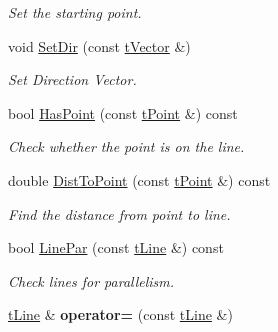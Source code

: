 \begin{DoxyCompactItemize}
\begin{DoxyCompactList}\small\item\em Set the starting point. \end{DoxyCompactList}\item 
\mbox{\label{classtLine_acff75aa6563c398c06c2ed5e4d118bb4}} 
void \hyperlink{classtLine_acff75aa6563c398c06c2ed5e4d118bb4}{Set\+Dir} (const \hyperlink{classtVector}{t\+Vector} \&)
\begin{DoxyCompactList}\small\item\em Set Direction Vector. \end{DoxyCompactList}\item 
\mbox{\label{classtLine_aeab725824ab76aa77c24c909086647f7}} 
bool \hyperlink{classtLine_aeab725824ab76aa77c24c909086647f7}{Has\+Point} (const \hyperlink{classtPoint}{t\+Point} \&) const
\begin{DoxyCompactList}\small\item\em Check whether the point is on the line. \end{DoxyCompactList}\item 
\mbox{\label{classtLine_a5b0fe2c1ec1e51fdd35021ab37532ea8}} 
double \hyperlink{classtLine_a5b0fe2c1ec1e51fdd35021ab37532ea8}{Dist\+To\+Point} (const \hyperlink{classtPoint}{t\+Point} \&) const
\begin{DoxyCompactList}\small\item\em Find the distance from point to line. \end{DoxyCompactList}\item 
\mbox{\label{classtLine_a1c3671f6868050035c0b2e5c90eaa143}} 
bool \hyperlink{classtLine_a1c3671f6868050035c0b2e5c90eaa143}{Line\+Par} (const \hyperlink{classtLine}{t\+Line} \&) const
\begin{DoxyCompactList}\small\item\em Check lines for parallelism. \end{DoxyCompactList}\item 
\mbox{\label{classtLine_aca3e282559b32039c0aae22eaff100f6}} 
\hyperlink{classtLine}{t\+Line} \& {\bfseries operator=} (const \hyperlink{classtLine}{t\+Line} \&)
\end{DoxyCompactItemize}
